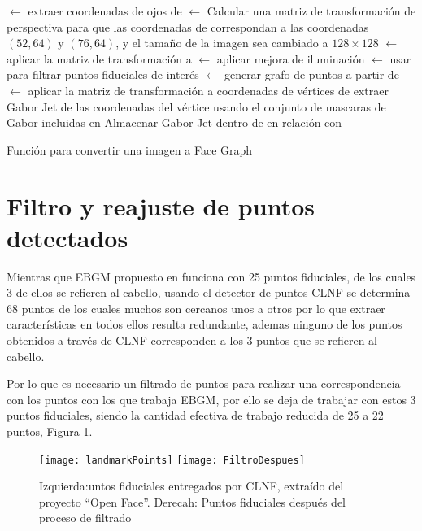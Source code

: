 \begin{algorithm}
\;
{
 $\gets$ extraer coordenadas de ojos de \;
 $\gets$ Calcular una matriz de transformación de perspectiva para que las coordenadas de  correspondan a las coordenadas $(52,64)$ y $(76,64)$,  y el tamaño de la imagen sea cambiado a $128 \times 128$\;
 $\gets$ aplicar la matriz de transformación  a \;
 $\gets$ aplicar mejora de iluminación\;
 $\gets$ usar  para filtrar puntos fiduciales de interés\;
 $\gets$ generar grafo de puntos a partir de \;
 $\gets$ aplicar la matriz de transformación  a coordenadas de vértices de \;
{
	extraer Gabor Jet de las coordenadas del vértice usando el conjunto de mascaras de Gabor incluidas en \;
    Almacenar Gabor Jet dentro de  en relación con \;
}
\Return {}\;
}

\caption{Función para convertir una imagen a Face Graph}
\label{alg:ImToGrph}
\end{algorithm}

\section{Filtro y reajuste de puntos detectados}
Mientras que \ac{EBGM} propuesto en \cite{bolme2003elastic} funciona con 25 puntos fiduciales, de los cuales 3 de ellos se refieren al cabello, usando el detector de puntos \ac{CLNF} se determina 68 puntos de los cuales muchos son cercanos unos a otros por lo que extraer características en todos ellos resulta redundante, ademas ninguno de los puntos obtenidos a través de \ac{CLNF} corresponden a los 3 puntos que se refieren al cabello.

Por lo que es necesario un filtrado de puntos para realizar una correspondencia con los puntos con los que trabaja \ac{EBGM}, por ello se deja de trabajar con estos 3 puntos fiduciales, siendo la cantidad efectiva de trabajo reducida de 25 a 22 puntos, Figura \ref{im:22Landmark}.

\begin{figure}[h]
\center
\texttt{[image: landmarkPoints]}
\texttt{[image: FiltroDespues]}
\caption{Izquierda:untos fiduciales entregados por \ac{CLNF}, extraído del proyecto ``Open Face''. Derecah: Puntos fiduciales después del proceso de filtrado}
\label{im:22Landmark}
\end{figure}

